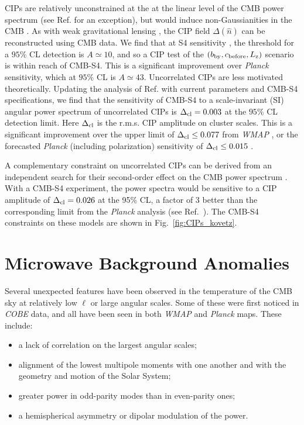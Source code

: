 CIPs are relatively unconstrained at the at the linear level of the CMB power spectrum (see Ref. \cite{Munoz:2015fdv} for an exception), but would induce non-Gaussianities in the CMB \cite{Grin:2011nk,Grin:2011tf,Grin:2013uya,He:2015msa}. As with weak gravitational lensing \cite{Hu:2001kj}, the CIP field $\Delta(\hat{n})$ can be reconstructed using CMB data. We find that at S4 sensitivity \cite{He:2015msa}, the threshold for a $95\%$ CL detection is $A\simeq 10$, and so a CIP test of the $(b_{\rm by}, c_{\rm before}, L_{\rm z})$ scenario is within reach of CMB-S4. This is a significant improvement over \emph{Planck} sensitivity, which at $95\%$ CL is $A\simeq 43$. Uncorrelated CIPs are less  motivated theoretically. Updating the analysis of Ref. \cite{He:2015msa} with current parameters \cite{Ade:2015lrj} and CMB-S4 specifications, we find that the sensitivity of CMB-S4 to a scale-invariant (SI) angular power spectrum of uncorrelated CIPs is $\Delta_{\rm cl}=0.003$ at the $95\%$ CL detection limit. Here $\Delta_{\rm cl}$ is the r.m.s. CIP amplitude on cluster scales. This is a significant improvement over the upper limit of $\Delta_{\rm cl}\leq 0.077$ from {\it WMAP\/} \cite{Grin:2013uya}, or the forecasted {\it Planck\/} \cite{Ade:2015lrj} (including polarization) sensitivity of $\Delta_{\rm cl}\leq 0.015$ \cite{He:2015msa}. 

A complementary constraint on uncorrelated CIPs can be derived from an independent search for their second-order effect on the CMB power spectrum \cite{Munoz:2015fdv}. With a CMB-S4 experiment, the power spectra would be sensitive to a CIP amplitude of $\Delta_{\rm cl} = 0.026$ at the 95\% CL, a factor of 3 better than the corresponding limit from the {\it Planck\/} analysis (see Ref.~\cite{Munoz:2015fdv}). The CMB-S4 constraints on these models are shown in Fig.~\ref{fig:CIPs_kovetz}.


\section{Microwave Background Anomalies}

Several unexpected features have been observed in the temperature of the CMB sky at relatively low $\ell$ or large angular scales.  Some of these were first noticed in {\it COBE\/} data,  
and all have been seen in both {\it WMAP\/} and {\it Planck\/} maps.  These include: 
\begin{itemize}
  \item a lack of correlation on the largest angular scales;
  \item alignment of the lowest multipole moments with one another and with the geometry and motion of the Solar System;
 \item greater power in odd-parity modes than in even-parity ones;
  \item a hemispherical asymmetry or dipolar modulation of the power.
\end{itemize}

